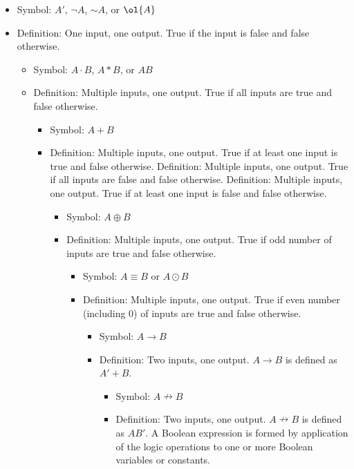\documentclass[a4paper,12pt]{article}
\begin{document}
\begin{itemize}
\item Symbol: $A'$, $\neg A$, $\mathord{\sim}A$, or $\ol{A}$
\item Definition: One input, one output. True if the input is false and false otherwise.
\eit 
{}
\begin{itemize}
\item Symbol: $A \cdot B$, $A*B$, or $AB$
\item Definition: Multiple inputs, one output. True if all inputs are true and false otherwise.
\eit
{}
\begin{itemize}
\item Symbol: $A + B$
\item Definition: Multiple inputs, one output. True if at least one input is true and false otherwise.
\eit
{}
Definition: Multiple inputs, one output. True if all inputs are false and false otherwise.
Definition: Multiple inputs, one output. True if at least one input is false and false otherwise.
\begin{itemize}
\item Symbol: $A \oplus B$
\item Definition: Multiple inputs, one output. True if odd number of inputs are true and false otherwise.
\eit
{}
\begin{itemize}
\item Symbol: $A\equiv B$ or $A\odot B$
\item Definition: Multiple inputs, one output. True if even number (including 0) of inputs are true and false otherwise.
\eit
{}
\begin{itemize}
\item Symbol: $A \rightarrow B$
\item Definition: Two inputs, one output. $A\rightarrow B$ is defined as $A'+B$.
\eit
{}
\begin{itemize}
\item Symbol: $A\nrightarrow B$
\item Definition: Two inputs, one output. $A\nrightarrow B$ is defined as $AB'$.
\eit
{}
A Boolean expression is formed by application of the logic operations to one or more Boolean variables or constants. 


\end{itemize}
\end{itemize}
\end{itemize}
\end{itemize}
\end{itemize}
\end{itemize}
\end{itemize}
\end{document}
